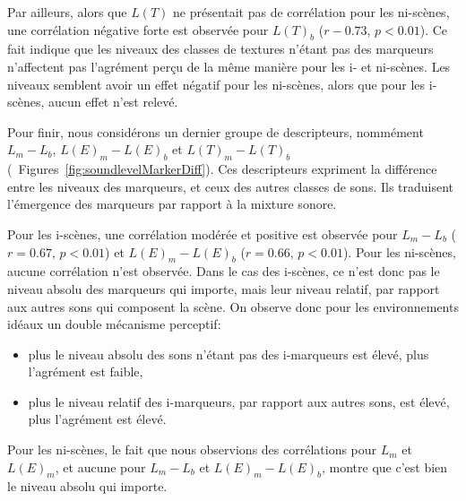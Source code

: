 Par ailleurs, alors que $L(T)$ ne présentait pas de corrélation pour les ni-scènes, une corrélation négative forte est observée pour $L(T)_b$ ($r-0.73$, $p<0.01$). Ce fait indique que les niveaux des classes de textures n'étant pas des marqueurs n'affectent pas l'agrément perçu de la même manière pour les i- et ni-scènes. Les niveaux semblent avoir un effet négatif pour les ni-scènes, alors que pour les i-scènes, aucun effet n'est relevé.

Pour finir, nous considérons un dernier groupe de descripteurs, nommément $L_m-L_b$, $L(E)_m-L(E)_b$ et $L(T)_m-L(T)_b$ (\cf~Figures~\ref{fig:soundlevelMarkerDiff}). Ces descripteurs expriment la différence entre les niveaux des marqueurs, et ceux des autres classes de sons. Ils traduisent l'émergence des marqueurs par rapport à la mixture sonore.

Pour les i-scènes, une corrélation modérée et positive est observée pour $L_m-L_b$ ($r=0.67$, $p<0.01$) et $L(E)_m-L(E)_b$ ($r=0.66$, $p<0.01$). Pour les ni-scènes, aucune corrélation n'est observée. Dans le cas des i-scènes, ce n'est donc pas le niveau absolu des marqueurs qui importe, mais leur niveau relatif, par rapport aux autres sons qui composent la scène. On observe donc pour les environnements idéaux un double mécanisme perceptif: 

\begin{itemize}
\item plus le niveau absolu des sons n'étant pas des i-marqueurs est élevé, plus l'agrément est faible,
\item plus le niveau relatif des i-marqueurs, par rapport aux autres sons, est élevé, plus l'agrément est élevé.
\end{itemize}

Pour les ni-scènes, le fait que nous observions des corrélations pour $L_m$ et $L(E)_m$, et aucune pour $L_m-L_b$ et $L(E)_m-L(E)_b$, montre que c'est bien le niveau absolu qui importe.

